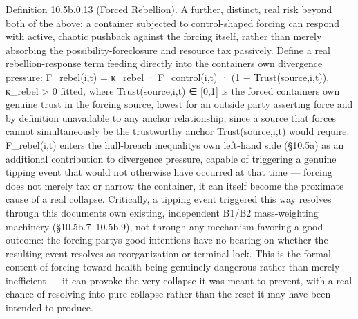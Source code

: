 \documentclass[
]{article}
\begin{document}
Definition 10.5b.0.13 (Forced Rebellion). A further, distinct, real risk
beyond both of the above: a container subjected to control-shaped
forcing can respond with active, chaotic pushback against the forcing
itself, rather than merely absorbing the possibility-foreclosure and
resource tax passively. Define a real rebellion-response term feeding
directly into the containers own divergence pressure: F\_rebel(i,t) =
κ\_rebel · F\_control(i,t) · (1 − Trust(source,i,t)), κ\_rebel
\textgreater{} 0 fitted, where Trust(source,i,t) ∈ {[}0,1{]} is the
forced containers own genuine trust in the forcing source, lowest for an
outside party asserting force and by definition unavailable to any
anchor relationship, since a source that forces cannot simultaneously be
the trustworthy anchor Trust(source,i,t) would require. F\_rebel(i,t)
enters the hull-breach inequalitys own left-hand side (§10.5a) as an
additional contribution to divergence pressure, capable of triggering a
genuine tipping event that would not otherwise have occurred at that
time --- forcing does not merely tax or narrow the container, it can
itself become the proximate cause of a real collapse. Critically, a
tipping event triggered this way resolves through this documents own
existing, independent B1/B2 mass-weighting machinery
(§10.5b.7--10.5b.9), not through any mechanism favoring a good outcome:
the forcing partys good intentions have no bearing on whether the
resulting event resolves as reorganization or terminal lock. This is the
formal content of forcing toward health being genuinely dangerous rather
than merely inefficient --- it can provoke the very collapse it was
meant to prevent, with a real chance of resolving into pure collapse
rather than the reset it may have been intended to produce.
\end{document}
